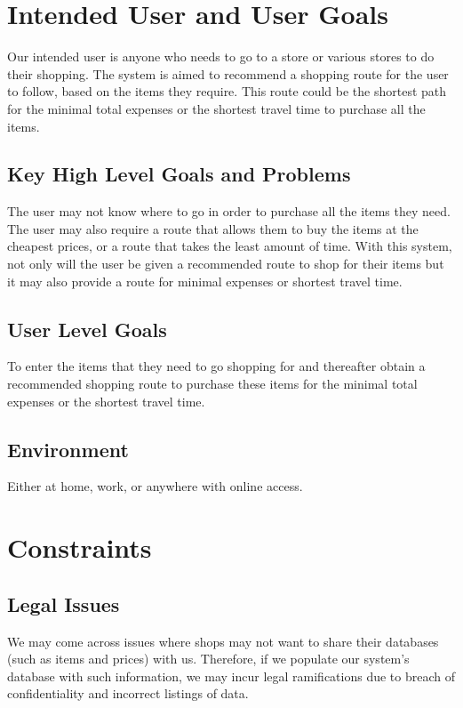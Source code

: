 \documentclass[12pt]{article}
\begin{document}
\section{Intended User and User Goals}
Our intended user is anyone who needs to go to a store or various stores to do their shopping. The system is aimed to recommend a shopping route for the user to follow, based on the items they require. This route could be the shortest path for the minimal total expenses or the shortest travel time to purchase all the items.
\subsection{Key High Level Goals and Problems}
The user may not know where to go in order to purchase all the items they need. The user may also require a route that allows them to buy the items at the cheapest prices, or a route that takes the least amount of time.
With this system, not only will the user be given a recommended route to shop for their items but it may also provide a route for minimal expenses or shortest travel time.
\subsection{User Level Goals}
To enter the items that they need to go shopping for and thereafter obtain a recommended shopping route to purchase these items for the minimal total expenses or the shortest travel time.
\subsection{Environment}
Either at home, work, or anywhere with online access.

\section{Constraints}
\subsection{Legal Issues}
We may come across issues where shops may not want to share their databases (such as items and prices) with us. Therefore, if we populate our system's database with such information, we may incur legal ramifications due to breach of confidentiality and incorrect listings of data. 
\end{document}
